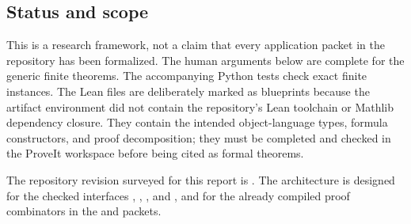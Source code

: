 \subsection*{Status and scope}
This is a research framework, not a claim that every application packet in the
repository has been formalized.  The human arguments below are complete for the
generic finite theorems.  The accompanying Python tests check exact finite
instances.  The Lean files are deliberately marked as blueprints because the
artifact environment did not contain the repository's Lean toolchain or
Mathlib dependency closure.  They contain the intended object-language types,
formula constructors, and proof decomposition; they must be completed and
checked in the ProveIt workspace before being cited as formal theorems.

The repository revision surveyed for this report is
.  The architecture is designed
for the checked  interfaces ,
, , and
, and for the already compiled proof
combinators in the  and
 packets.
